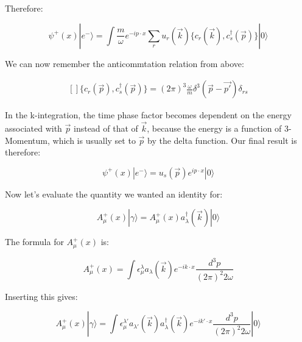 \documentclass[a4]{article}
\begin{document}
\begin{framed}
        Therefore:

        \begin{equation}
            \psi^{+} (x) | e^{-} \rangle = \int \frac{m}{\omega} e^{-i p \cdot x} \sum_{r} u_{r} (\vec{k}) \{ c_{r} (\vec{k}) , c_{s}^{\dag} (\vec{p}) \} | 0 \rangle
        \end{equation}

        We can now remember the anticommtation relation from above:
        
        \begin{equation}
            \begin{aligned}[]
                \{ c_{r} (\vec{p}), c_{s}^{\dagger} (\vec{p}) \} = (2 \pi)^3 \frac{\omega}{m} \delta^{3} (\vec{p} - \vec{p'}) \delta_{rs}
            \end{aligned}
        \end{equation}

        In the k-integration, the time phase factor becomes dependent on the energy associated with $\vec{p}$ instead of that of $\vec{k}$, because the energy is a function
        of 3-Momentum, which is usually set to $\vec{p}$ by the delta function. Our final result is therefore:

        \begin{framed}
            \begin{equation}
                \psi^{+} (x) | e^{-} \rangle = u_{s} (\vec{p}) e^{i p \cdot x} | 0 \rangle
            \end{equation}
        \end{framed}

        Now let's evaluate the quantity we wanted an identity for:

        \begin{equation}
            A_{\mu}^{+} (x) | \gamma \rangle = A_{\mu}^{+} (x) a_{\lambda}^{\dagger} (\vec{k}) | 0 \rangle
        \end{equation}

        The formula for $A_{\mu}^{+} (x)$ is:

        \begin{equation}
            A_{\mu}^{+} (x) = \int \epsilon^{\lambda}_{\mu} a_{\lambda} (\vec{k}) e^{- i k \cdot x} \frac{d^3 p}{(2 \pi)^2 2 \omega}
        \end{equation}

        Inserting this gives:

        \begin{equation}
            A_{\mu}^{+} (x) | \gamma \rangle = \int \epsilon^{\lambda'}_{\mu} a_{\lambda'} (\vec{k}) a_{\lambda}^{\dagger} (\vec{k}) e^{- i k' \cdot x} \frac{d^3 p}{(2 \pi)^2 2 \omega} | 0 \rangle
        \end{equation}


\end{framed}
\end{document}
